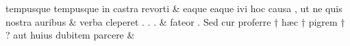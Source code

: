 \documentclass[12pt,onecolumn,twoside,a4paper]{memoir}
\begin{document}
\begin{pairs}
\begin{Leftside}
                              tempusque
                              {tempusque}
                              in
                              castra
                              revorti \&
                         \stanza {}eaque
                              {eaque}
                              ivi
                              hoc
                              causa
                              ,
                              ut
                              ne
                              quis
                              nostra
                              auribus & 
                     verba
                              cleperet
                              .
                              .
                              . \&
                         \stanza {}fateor
                              .
                              Sed
                              cur
                              proferre
                              †
                              hæc
                              †
                              pigrem
                              †
                              ?
                              aut
                              huius
                              dubitem
                              parcere & 
                     

\end{Leftside}
\end{pairs}
\end{document}
